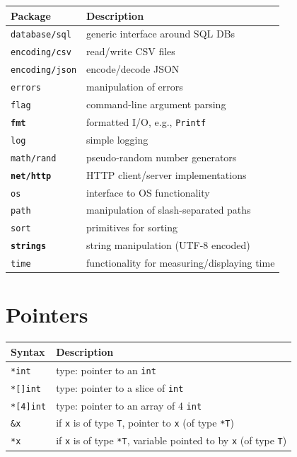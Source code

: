 \documentclass{article}
\begin{document}
\begin{multicols*}{3}
  \begin{tabular}{p{0.8in}p{2.2in}}
    \toprule
    \textbf{Package} & \textbf{Description} \\
    \midrule
    \texttt{database/sql} & generic interface around SQL DBs \\
    \texttt{encoding/csv} & read/write CSV files \\
    \texttt{encoding/json} & encode/decode JSON \\
    \texttt{errors} & manipulation of errors \\
    \texttt{flag} & command-line argument parsing \\
    \textbf{\texttt{fmt}} & formatted I/O, e.g., \texttt{Printf} \\
    \texttt{log} & simple logging\\
    \texttt{math/rand} & pseudo-random number generators \\
    \textbf{\texttt{net/http}} & HTTP client/server implementations \\
    \texttt{os} & interface to OS functionality \\
    \texttt{path} & manipulation of slash-separated paths \\
    \texttt{sort} & primitives for sorting \\
    \textbf{\texttt{strings}} & string manipulation (UTF-8 encoded) \\
    \texttt{time} & functionality for measuring/displaying time \\
    \bottomrule
  \end{tabular}

  \filbreak
  \section*{Pointers}

  \begin{tabular}{p{0.48in}p{2.52in}}
    \toprule
    \textbf{Syntax} & \textbf{Description} \\
    \midrule
    \lstinline!*int! & type: pointer to an \texttt{int} \\
    \lstinline!*[]int! & type: pointer to a slice of \texttt{int} \\
    \lstinline!*[4]int! & type: pointer to an array of 4 \texttt{int} \\
    \midrule
    \texttt{\&x} & if \texttt{x} is of type \texttt{T}, pointer to \texttt{x} (of type \texttt{*T}) \\
    \texttt{*x} & if \texttt{x} is of type \texttt{*T}, variable pointed to by \texttt{x} (of type \texttt{T}) \\
    \bottomrule
  \end{tabular}


\end{multicols*}
\end{document}
